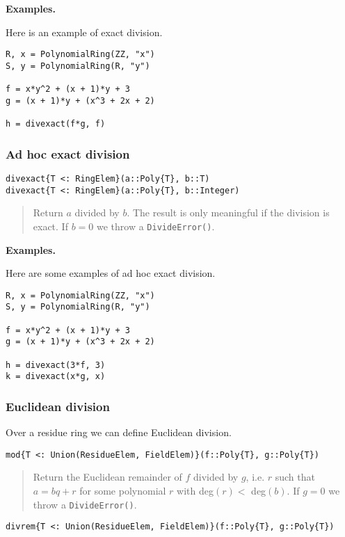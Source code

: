 \documentclass[a4paper,10pt]{article}
\newcommand{\code}{\lstinline}
\newcommand{\desc}[1]{\vspace{-3mm}\begin{quote}#1\end{quote}}
\begin{document}
\textbf{Examples.}

Here is an example of exact division.

\begin{lstlisting}
R, x = PolynomialRing(ZZ, "x")
S, y = PolynomialRing(R, "y")

f = x*y^2 + (x + 1)*y + 3
g = (x + 1)*y + (x^3 + 2x + 2)

h = divexact(f*g, f)
\end{lstlisting}

\subsubsection{Ad hoc exact division}

\begin{lstlisting}
divexact{T <: RingElem}(a::Poly{T}, b::T)
divexact{T <: RingElem}(a::Poly{T}, b::Integer)
\end{lstlisting}

\desc{Return $a$ divided by $b$. The result is only meaningful if the division is
exact. If $b = 0$ we throw a \code{DivideError()}.}

\textbf{Examples.}

Here are some examples of ad hoc exact division.

\begin{lstlisting}
R, x = PolynomialRing(ZZ, "x")
S, y = PolynomialRing(R, "y")

f = x*y^2 + (x + 1)*y + 3
g = (x + 1)*y + (x^3 + 2x + 2)

h = divexact(3*f, 3)
k = divexact(x*g, x)
\end{lstlisting}

\subsubsection{Euclidean division}

Over a residue ring we can define Euclidean division.

\begin{lstlisting}
mod{T <: Union(ResidueElem, FieldElem)}(f::Poly{T}, g::Poly{T})
\end{lstlisting}

\desc{Return the Euclidean remainder of $f$ divided by $g$, i.e. $r$ such 
that $a = bq + r$ for some polynomial $r$ with deg$(r) <$ deg$(b)$. If 
$g = 0$ we throw a \code{DivideError()}.}

\begin{lstlisting}
divrem{T <: Union(ResidueElem, FieldElem)}(f::Poly{T}, g::Poly{T})
\end{lstlisting}
\end{document}
